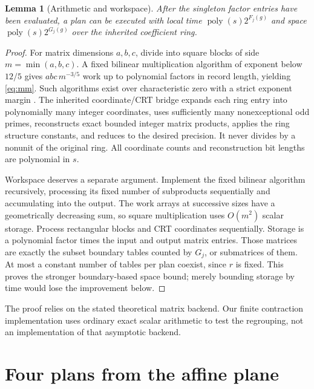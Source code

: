 \documentclass[11pt]{article}
\newtheorem{lemma}[theorem]{Lemma}
\theoremstyle{definition}\newtheorem{definition}[theorem]{Definition}
\theoremstyle{remark}\newtheorem{remark}[theorem]{Remark}
\newcommand{\poly}{\operatorname{poly}}
\begin{document}
\begin{lemma}[Arithmetic and workspace]\label{lem:workspace}
After the singleton factor entries have been evaluated, a plan can be
executed with local time $\poly(s)2^{F_j(g)}$ and space
$\poly(s)2^{G_j(g)}$ over the inherited coefficient ring.
\end{lemma}
\begin{proof}
For matrix dimensions $a,b,c$, divide into square blocks of side
$m=\min(a,b,c)$. A fixed bilinear multiplication algorithm of exponent
below $12/5$ gives $abc\,m^{-3/5}$ work up to polynomial factors in record
length, yielding \eqref{eq:mm}. Such algorithms exist over characteristic
zero with a strict exponent margin \cite{mm}. The inherited coordinate/CRT
bridge expands each ring entry into polynomially many integer coordinates,
uses sufficiently many nonexceptional odd primes, reconstructs exact bounded
integer matrix products, applies the ring structure constants, and reduces
to the desired precision. It never divides by a nonunit of the original ring.
All coordinate counts and reconstruction bit lengths are polynomial in $s$.

Workspace deserves a separate argument. Implement the fixed bilinear
algorithm recursively, processing its fixed number of subproducts
sequentially and accumulating into the output. The work arrays at
successive sizes have a geometrically decreasing sum, so square
multiplication uses $O(m^2)$ scalar storage. Process rectangular blocks and
CRT coordinates sequentially. Storage is a polynomial factor times the
input and output matrix entries. Those matrices are exactly the subset
boundary tables counted by $G_j$, or submatrices of them. At most a constant
number of tables per plan coexist, since $r$ is fixed. This proves the
stronger boundary-based space bound; merely bounding storage by time
would lose the improvement below.
\end{proof}

The proof relies on the stated theoretical matrix backend. Our finite
contraction implementation uses ordinary exact scalar arithmetic to test
the regrouping, not an implementation of that asymptotic backend.

\section{Four plans from the affine plane}
\label{sec:affine}
\end{document}
